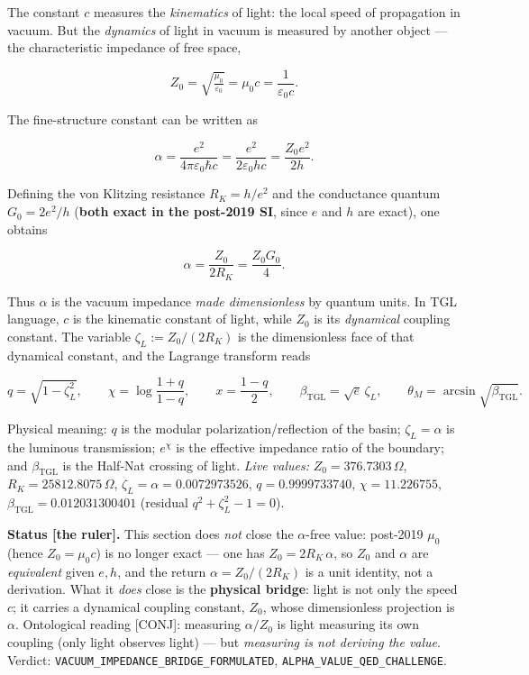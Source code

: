 \documentclass[11pt]{article}
\newcommand{\bTGL}{\beta_{\mathrm{TGL}}}\newcommand{\Msun}{M_{\odot}}\newcommand{\TGL}{\mathrm{TGL}}
\theoremstyle{definition}\newtheorem{deriv}{Derivation}
\begin{document}
The constant $c$ measures the \emph{kinematics} of light: the local speed of propagation in vacuum. But the \emph{dynamics} of light in vacuum is measured by another object --- the characteristic impedance of free space,

\begin{equation} Z_0=\sqrt{\tfrac{\mu_0}{\varepsilon_0}}=\mu_0 c=\frac{1}{\varepsilon_0 c}.\end{equation}

The fine-structure constant can be written as

\begin{equation} \alpha=\frac{e^2}{4\pi\varepsilon_0\hbar c}=\frac{e^2}{2\varepsilon_0 h c}=\frac{Z_0 e^2}{2h}.\end{equation}

Defining the von Klitzing resistance $R_K=h/e^2$ and the conductance quantum $G_0=2e^2/h$ (\textbf{both exact in the post-2019 SI}, since $e$ and $h$ are exact), one obtains

\begin{equation} \alpha=\frac{Z_0}{2R_K}=\frac{Z_0 G_0}{4}.\end{equation}

Thus $\alpha$ is the vacuum impedance \emph{made dimensionless} by quantum units. In TGL language, $c$ is the kinematic constant of light, while $Z_0$ is its \emph{dynamical} coupling constant. The variable $\zeta_L:=Z_0/(2R_K)$ is the dimensionless face of that dynamical constant, and the Lagrange transform reads

\begin{equation} q=\sqrt{1-\zeta_L^2},\qquad \chi=\log\frac{1+q}{1-q},\qquad x=\frac{1-q}{2},\qquad \bTGL=\sqrt e\,\zeta_L,\qquad \theta_M=\arcsin\sqrt{\bTGL}.\end{equation}

Physical meaning: $q$ is the modular polarization/reflection of the basin; $\zeta_L=\alpha$ is the luminous transmission; $e^\chi$ is the effective impedance ratio of the boundary; and $\bTGL$ is the Half-Nat crossing of light. \emph{Live values:} $Z_0=376.7303\,\Omega$, $R_K=25812.8075\,\Omega$, $\zeta_L=\alpha=0.0072973526$, $q=0.9999733740$, $\chi=11.226755$, $\bTGL=0.012031300401$ (residual $q^2+\zeta_L^2-1=0$).

\textbf{Status \textsf{[the ruler]}.} This section does \emph{not} close the $\alpha$-free value: post-2019 $\mu_0$ (hence $Z_0=\mu_0 c$) is no longer exact --- one has $Z_0=2R_K\,\alpha$, so $Z_0$ and $\alpha$ are \emph{equivalent} given $e,h$, and the return $\alpha=Z_0/(2R_K)$ is a unit identity, not a derivation. What it \emph{does} close is the \textbf{physical bridge}: light is not only the speed $c$; it carries a dynamical coupling constant, $Z_0$, whose dimensionless projection is $\alpha$. Ontological reading \textsf{[CONJ]}: measuring $\alpha/Z_0$ is light measuring its own coupling (only light observes light) --- but \emph{measuring is not deriving the value}. Verdict: \texttt{VACUUM\_IMPEDANCE\_BRIDGE\_FORMULATED}, \texttt{ALPHA\_VALUE\_QED\_CHALLENGE}.
\end{document}
